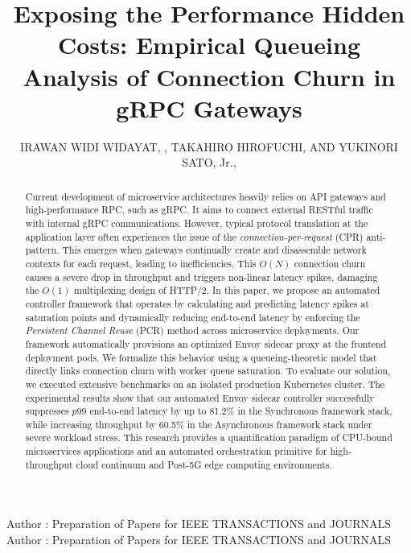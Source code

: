 \documentclass{ieeeaccess}
\begin{document}

\title{Exposing the Performance Hidden Costs: Empirical Queueing Analysis of Connection Churn in gRPC Gateways}
\author{\uppercase{Irawan Widi Widayat}, ,
\uppercase{Takahiro Hirofuchi}, AND \uppercase{Yukinori Sato},
Jr.,}

\address[1]{Department of Computer Science and Engineering, Toyohashi University of Technology, Japan}
\address[2]{National Institute of Advanced Industrial Science and Technology, Tokyo, Japan}
\address[3]{Department of Computer Science and Engineering, Toyohashi University of Technology, Japan}

\markboth
{Author \headeretal: Preparation of Papers for IEEE TRANSACTIONS and JOURNALS}
{Author \headeretal: Preparation of Papers for IEEE TRANSACTIONS and JOURNALS}



\begin{abstract}
Current development of microservice architectures heavily relies on API gateways and high-performance RPC, such as gRPC. It aims to connect 
external RESTful traffic with internal gRPC communications. However, typical protocol translation at the application layer often experiences the issue of the \textit{connection-per-request} (CPR) anti-pattern. This emerges when gateways continually create and disassemble network contexts for each request, leading to inefficiencies. This $O(N)$ connection churn causes a severe drop in throughput and triggers non-linear latency spikes, damaging the $O(1)$ multiplexing design of HTTP/2. In this paper, we propose an automated controller framework that operates by calculating and predicting latency spikes at saturation points and dynamically reducing end-to-end latency by enforcing the \textit{Persistent Channel Reuse} (PCR) method across microservice deployments. Our framework automatically provisions an optimized Envoy sidecar proxy at the frontend deployment pods. We formalize this behavior using a queueing-theoretic model that directly links connection churn with worker queue saturation. To evaluate our solution, we executed extensive benchmarks on an isolated production Kubernetes cluster. The experimental results show that our automated Envoy sidecar controller successfully suppresses $p99$ end-to-end latency by up to 81.2\% in the Synchronous framework stack, while increasing throughput by 60.5\% in the Asynchronous framework stack under severe workload stress. This research provides a quantification paradigm of CPU-bound microservices applications and an automated orchestration primitive for high-throughput cloud continuum and Post-5G edge computing environments. 
\end{abstract}
\end{document}
